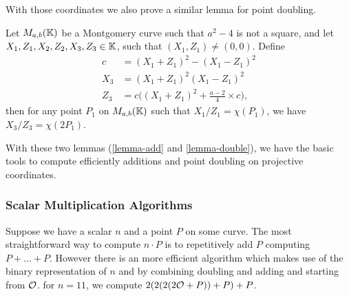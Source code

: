With those coordinates we also prove a similar lemma for point doubling.
\begin{lemma}
\label{lemma-double}
Let $M_{a,b}(\mathbb{K})$ be a Montgomery curve such that $a^2-4$ is not a square, and
let $X_1, Z_1, X_2, Z_2, X_3, Z_3 \in \mathbb{K}$, such that $(X_1,Z_1) \neq (0,0)$. Define
\begin{align*}
  c &= (X_1 + Z_1)^2 - (X_1 - Z_1)^2\\
X_3 &= (X_1 + Z_1)^2(X_1-Z_1)^2\\
Z_3 &= c\Big((X_1 + Z_1)^2+\frac{a-2}{4}\times c\Big),
\end{align*}
then for any point $P_1$ on $M_{a,b}(\mathbb{K})$ such that $X_1/Z_1 = \chi(P_1)$,
we have $X_3/Z_3 = \chi(2P_1)$.
\end{lemma}

With these two lemmas (\ref{lemma-add} and \ref{lemma-double}), we have the basic
tools to compute efficiently additions and point doubling on projective coordinates.

\subsubsection{Scalar Multiplication Algorithms}
\label{ladder}

Suppose we have a scalar $n$ and a point $P$ on some curve. The most straightforward
way to compute $n \cdot P$ is to repetitively add $P$ \ie computing $P + \ldots + P$.
However there is an more efficient algorithm which makes use of the binary
representation of $n$ and by combining doubling and adding and starting from $\mathcal{O}$.
\eg for $n=11$, we compute $2(2(2(2\mathcal{O} + P)) + P)+ P$.



